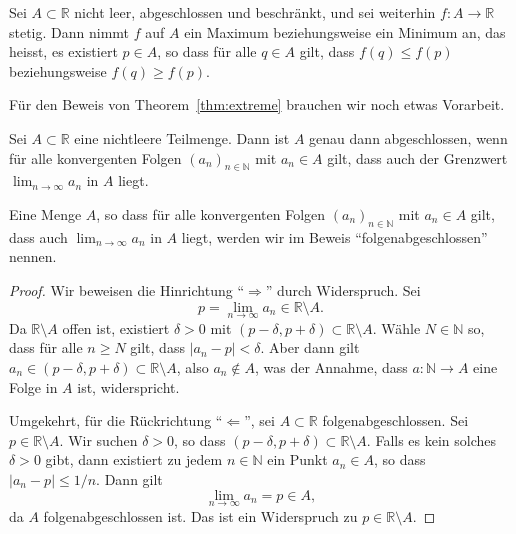\documentclass[../main.tex]{subfiles}
\begin{document}
\begin{theorem}\label{thm:extreme}
  Sei $A \subset \mathbb{R}$ nicht leer, abgeschlossen
  und beschränkt,
  und sei weiterhin $f \colon A \to \mathbb{R}$
  stetig. Dann nimmt $f$ auf $A$ ein
  Maximum beziehungsweise ein Minimum an,
  das heisst, es existiert $p \in A$,
  so dass für alle $q \in A$ gilt,
  dass $f(q) \leq f(p)$ beziehungsweise $f(q) \geq f(p)$.
\end{theorem}

Für den Beweis von Theorem~\ref{thm:extreme}
brauchen wir noch etwas Vorarbeit.

\begin{lemma*}[Folgenabgeschlossenheit]
  Sei $A \subset \mathbb{R}$ eine nichtleere Teilmenge.
  Dann ist $A$ genau dann abgeschlossen, wenn für
  alle konvergenten Folgen
  ${(a_{n})}_{n \in \mathbb{N}}$ mit
  $a_n \in A$ gilt, dass auch
  der Grenzwert $\lim_{n \to \infty} a_n$ in $A$ 
  liegt.
\end{lemma*}

Eine Menge $A$, 
so dass für alle konvergenten Folgen
${(a_{n})}_{n \in \mathbb{N}}$ mit
$a_n  \in A$ gilt,
dass auch $\lim_{n \to \infty}a_n$
in $A$ liegt, werden wir im Beweis
``folgenabgeschlossen'' nennen.

\begin{proof}
  Wir beweisen die Hinrichtung ``$\Rightarrow$'' durch Widerspruch.
  Sei
  \[
    p = \lim_{n \to \infty} a_n \in \mathbb{R} \setminus A.
  \]
  Da $\mathbb{R} \setminus A$ offen ist,
  existiert $\delta > 0$ mit $(p - \delta, p + \delta)
  \subset \mathbb{R} \setminus A$.
  Wähle $N \in \mathbb{N}$  so, dass für alle $n \geq N$
  gilt, dass $|a_n - p| < \delta$.
  Aber dann gilt $a_n \in (p - \delta, p + \delta)
  \subset \mathbb{R} \setminus A$,
  also $a_n \notin A$, was der Annahme, dass 
  $a \colon \mathbb{N} \to A$
  eine Folge in $A$ ist, widerspricht.

  Umgekehrt, für die Rückrichtung ``$\Leftarrow$'', sei
  $A \subset \mathbb{R}$ folgenabgeschlossen.
  Sei $p \in \mathbb{R} \setminus A$. Wir suchen
  $\delta > 0$, so dass $(p - \delta, p + \delta)
  \subset \mathbb{R} \setminus A$. Falls es kein
  solches $\delta > 0$ gibt, dann existiert zu jedem
  $n \in \mathbb{N}$ ein Punkt $a_n \in A$, so dass
  $|a_n - p| \leq 1/n$.
  Dann gilt
  \[
    \lim_{n \to \infty} a_n = p \in A,
  \]
  da $A$ folgenabgeschlossen ist. Das ist ein Widerspruch
  zu $p \in \mathbb{R} \setminus A$.
\end{proof}
\end{document}
